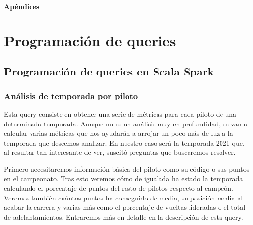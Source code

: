 \documentclass[12pt,twoside,titlepage]{report}
\newcommand\blankpage{%
    \newpage
    \null
    \thispagestyle{empty}%
    \newpage}
\begin{document}

{}

\footnotesize{

%

}



\raggedbottom
\afterpage{\blankpage}

\newpage





\appendix

{}

\mbox{}
\vfill
\begin{center}
\begin{Huge}
\textbf{Apéndices}
\end{Huge}
\end{center}
\vfill
\mbox{}
\thispagestyle{empty}

\newpage
\mbox{}
\thispagestyle{empty}
\newpage


\chapter{Programación de queries}
\label{sec:apendice}

\section{Programación de queries en Scala Spark}

\label{extrascala}

\subsection{Análisis de temporada por piloto} \label{analisistemporada}

Esta query consiste en obtener una serie de métricas para cada piloto de una determinada temporada. Aunque no es un análisis muy en profundidad, se van a calcular varias métricas que nos ayudarán a arrojar un poco más de luz a la temporada que deseemos analizar. En nuestro caso será la temporada 2021 que, al resultar tan interesante de ver, suscitó preguntas que buscaremos resolver.

Primero necesitaremos información básica del piloto como su código o sus puntos en el campeonato. Tras esto veremos cómo de igualada ha estado la temporada calculando el porcentaje de puntos del resto de pilotos respecto al campeón. Veremos también cuántos puntos ha conseguido de media, su posición media al acabar la carrera y varias más como el porcentaje de vueltas lideradas o el total de adelantamientos. Entraremos más en detalle en la descripción de esta query.
\end{document}
